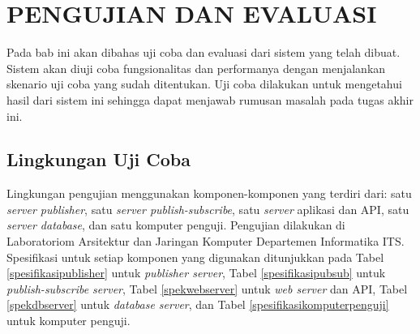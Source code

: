 \chapter{PENGUJIAN DAN EVALUASI}
	Pada bab ini akan dibahas uji coba dan evaluasi dari sistem yang telah dibuat. Sistem akan diuji coba fungsionalitas dan performanya dengan menjalankan skenario uji coba yang sudah ditentukan. Uji coba dilakukan untuk mengetahui hasil dari sistem ini sehingga dapat menjawab rumusan masalah pada tugas akhir ini.    
	
\section{Lingkungan Uji Coba}
	Lingkungan pengujian menggunakan komponen-komponen yang terdiri dari: satu \textit{server publisher}, satu \textit{server publish-subscribe}, satu \textit{server} aplikasi dan API, satu \textit{server database}, dan satu komputer penguji. Pengujian dilakukan di Laboratoriom Arsitektur dan Jaringan Komputer Departemen Informatika ITS. \\
    \indent Spesifikasi untuk setiap komponen yang digunakan ditunjukkan pada Tabel \ref{spesifikasipublisher} untuk \textit{publisher server}, Tabel \ref{spesifikasipubsub} untuk \textit{publish-subscribe server}, Tabel \ref{spekwebserver} untuk \textit{web server} dan API, Tabel \ref{spekdbserver} untuk \textit{database server}, dan Tabel \ref{spesifikasikomputerpenguji} untuk komputer penguji.
\pagebreak
